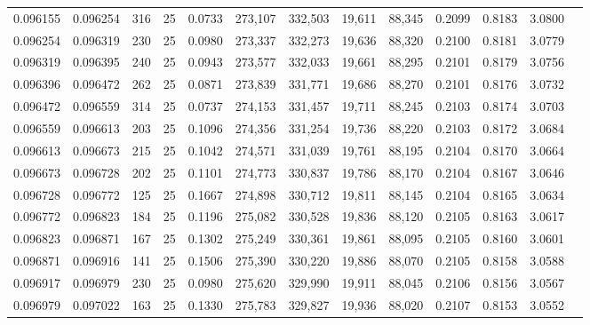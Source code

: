 \begin{tabular}{rrrrrrrrrrrrr}
0.096155 & 0.096254 &   316 &  25 &                                     0.0733 & 273,107 & 332,503 &  19,611 &  88,345 & 0.2099 & 0.8183 & 3.0800 \\
0.096254 & 0.096319 &   230 &  25 &                                     0.0980 & 273,337 & 332,273 &  19,636 &  88,320 & 0.2100 & 0.8181 & 3.0779 \\
0.096319 & 0.096395 &   240 &  25 &                                     0.0943 & 273,577 & 332,033 &  19,661 &  88,295 & 0.2101 & 0.8179 & 3.0756 \\
0.096396 & 0.096472 &   262 &  25 &                                     0.0871 & 273,839 & 331,771 &  19,686 &  88,270 & 0.2101 & 0.8176 & 3.0732 \\
0.096472 & 0.096559 &   314 &  25 &                                     0.0737 & 274,153 & 331,457 &  19,711 &  88,245 & 0.2103 & 0.8174 & 3.0703 \\
0.096559 & 0.096613 &   203 &  25 &                                     0.1096 & 274,356 & 331,254 &  19,736 &  88,220 & 0.2103 & 0.8172 & 3.0684 \\
0.096613 & 0.096673 &   215 &  25 &                                     0.1042 & 274,571 & 331,039 &  19,761 &  88,195 & 0.2104 & 0.8170 & 3.0664 \\
0.096673 & 0.096728 &   202 &  25 &                                     0.1101 & 274,773 & 330,837 &  19,786 &  88,170 & 0.2104 & 0.8167 & 3.0646 \\
0.096728 & 0.096772 &   125 &  25 &                                     0.1667 & 274,898 & 330,712 &  19,811 &  88,145 & 0.2104 & 0.8165 & 3.0634 \\
0.096772 & 0.096823 &   184 &  25 &                                     0.1196 & 275,082 & 330,528 &  19,836 &  88,120 & 0.2105 & 0.8163 & 3.0617 \\
0.096823 & 0.096871 &   167 &  25 &                                     0.1302 & 275,249 & 330,361 &  19,861 &  88,095 & 0.2105 & 0.8160 & 3.0601 \\
0.096871 & 0.096916 &   141 &  25 &                                     0.1506 & 275,390 & 330,220 &  19,886 &  88,070 & 0.2105 & 0.8158 & 3.0588 \\
0.096917 & 0.096979 &   230 &  25 &                                     0.0980 & 275,620 & 329,990 &  19,911 &  88,045 & 0.2106 & 0.8156 & 3.0567 \\
0.096979 & 0.097022 &   163 &  25 &                                     0.1330 & 275,783 & 329,827 &  19,936 &  88,020 & 0.2107 & 0.8153 & 3.0552 \\

\end{tabular}
